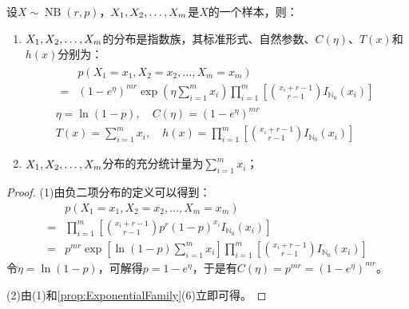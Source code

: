 \begin{theorem}
	设$X\sim\operatorname{NB}(r,p)$，$X_1, X_2, \dots, X_{m}$是$X$的一个样本，则：
	\begin{enumerate}
		\item $X_1, X_2, \dots, X_{m}$的分布是指数族，其标准形式、自然参数、$C(\eta)$、$T(x)$和$h(x)$分别为：
		\begin{gather*}
			\begin{aligned}
				&p(X_1=x_1,X_2=x_2,\dots,X_m=x_m) \\
				=&(1-e^{\eta})^{mr}\exp\left(\eta\sum_{i=1}^{m}x_i\right)\prod_{i=1}^{m}\left[\binom{x_i+r-1}{r-1}I_{\mathbb{N}_0}(x_i)\right]
			\end{aligned} \\
			\eta=\ln(1-p),\quad C(\eta)=(1-e^{\eta})^{mr} \\
			T(x)=\sum_{i=1}^{m}x_i,\quad h(x)=\prod_{i=1}^{m}\left[\binom{x_i+r-1}{r-1}I_{\mathbb{N}_0}(x_i)\right]
		\end{gather*}
		\item $X_1, X_2, \dots, X_{m}$分布的充分统计量为$\sum\limits_{i=1}^{m}x_i$；
	\end{enumerate}
\end{theorem}
\begin{proof}
	(1)由负二项分布的定义可以得到：
	\begin{align*}
		&p(X_1=x_1,X_2=x_2,\dots,X_m=x_m) \\
		=&\prod_{i=1}^{m}\left[\binom{x_i+r-1}{r-1}p^r(1-p)^{x_i}I_{\mathbb{N}_0}(x_i)\right] \\
		=&p^{mr}\exp\left[\ln(1-p)\sum_{i=1}^{m}x_i\right]\prod_{i=1}^{m}\left[\binom{x_i+r-1}{r-1}I_{\mathbb{N}_0}(x_i)\right]
	\end{align*}
	令$\eta=\ln(1-p)$，可解得$p=1-e^{\eta}$，于是有$C(\eta)=p^{mr}=(1-e^{\eta})^{mr}$。\par
	(2)由(1)和\cref{prop:ExponentialFamily}(6)立即可得。
\end{proof}

